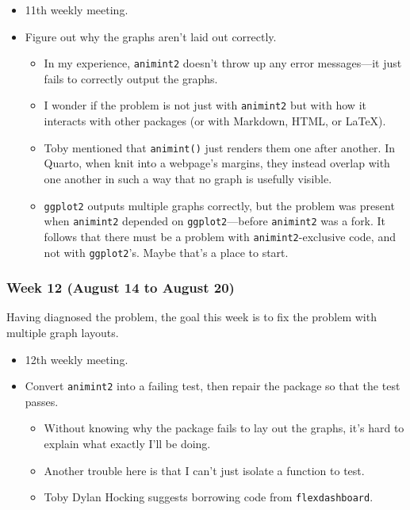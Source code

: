 \documentclass[
]{article}
\providecommand{\tightlist}{%
  \setlength{\itemsep}{0pt}\setlength{\parskip}{0pt}}\usepackage{longtable,booktabs,array}
\begin{document}
\begin{itemize}
\item
  11th weekly meeting.
\item
  Figure out why the graphs aren't laid out correctly.

  \begin{itemize}
  \tightlist
  \item
    In my experience, \texttt{animint2} doesn't throw up any error
    messages---it just fails to correctly output the graphs.
  \item
    I wonder if the problem is not just with \texttt{animint2} but with
    how it interacts with other packages (or with Markdown, HTML, or
    \LaTeX).
  \item
    Toby mentioned that \texttt{animint()} just renders them one after
    another. In Quarto, when knit into a webpage's margins, they instead
    overlap with one another in such a way that no graph is usefully
    visible.
  \item
    \texttt{ggplot2} outputs multiple graphs correctly, but the problem
    was present when \texttt{animint2} depended on
    \texttt{ggplot2}---before \texttt{animint2} was a fork. It follows
    that there must be a problem with \texttt{animint2}-exclusive code,
    and not with \texttt{ggplot2}'s. Maybe that's a place to start.
  \end{itemize}
\end{itemize}

\hypertarget{week-12-august-14-to-august-20}{%
\subsubsection{Week 12 (August 14 to August
20)}\label{week-12-august-14-to-august-20}}

Having diagnosed the problem, the goal this week is to fix the problem
with multiple graph layouts.

\begin{itemize}
\item
  12th weekly meeting.
\item
  Convert \texttt{animint2} into a failing test, then repair the package
  so that the test passes.

  \begin{itemize}
  \tightlist
  \item
    Without knowing why the package fails to lay out the graphs, it's
    hard to explain what exactly I'll be doing.
  \item
    Another trouble here is that I can't just isolate a function to
    test.
  \item
    Toby Dylan Hocking suggests borrowing code from
    \texttt{flexdashboard}.
  \end{itemize}
\end{itemize}
\end{document}
